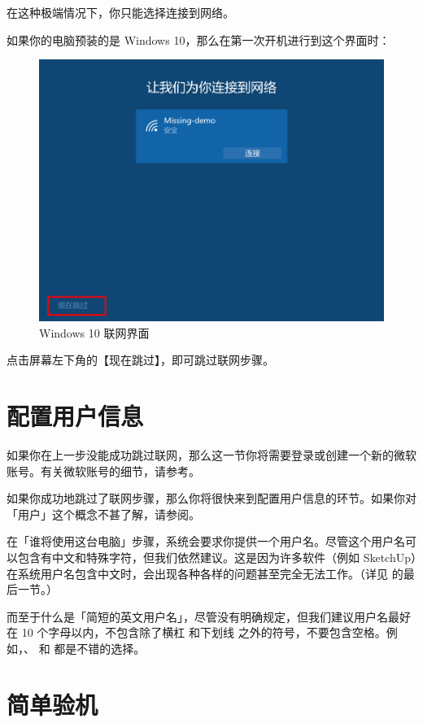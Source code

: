在这种极端情况下，你只能选择连接到网络。

如果你的电脑预装的是 Windows 10，那么在第一次开机进行到这个界面时：

\begin{figure}[htb!]
  \centering
  \includegraphics[width=.5\textwidth]{assets/appendix/Windows_10_skip_internet.png}
  \caption{Windows 10 联网界面}
  \label{fig:Windows_10_skip_internet}
\end{figure}

点击屏幕左下角的【现在跳过】，即可跳过联网步骤。

\section{配置用户信息}

\begin{note}
  如果你在上一步没能成功跳过联网，那么这一节你将需要登录或创建一个新的微软账号。有关微软账号的细节，请参考。
\end{note}

如果你成功地跳过了联网步骤，那么你将很快来到配置用户信息的环节。如果你对「用户」这个概念不甚了解，请参阅。

在「谁将使用这台电脑」步骤，系统会要求你提供一个用户名。尽管这个用户名可以包含有中文和特殊字符，但我们依然建议。这是因为许多软件（例如 SketchUp）在系统用户名包含中文时，会出现各种各样的问题甚至完全无法工作。（详见 的最后一节。）

而至于什么是「简短的英文用户名」，尽管没有明确规定，但我们建议用户名最好在 10 个字母以内，不包含除了横杠 \MissingVerb{-} 和下划线 \MissingVerb{_} 之外的符号，不要包含空格。例如，、  和  都是不错的选择。

\section{简单验机}

